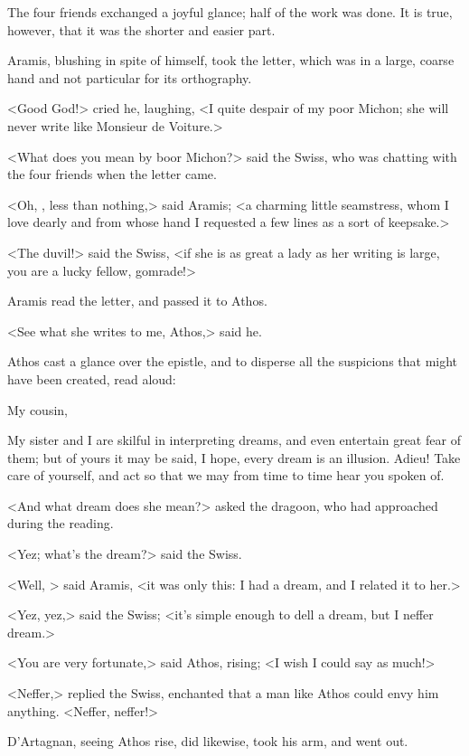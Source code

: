 The four friends exchanged a joyful glance; half of the work was done. It is true, however, that it was the shorter and easier part. 

Aramis, blushing in spite of himself, took the letter, which was in a large, coarse hand and not particular for its orthography. 

<Good God!> cried he, laughing, <I quite despair of my poor Michon; she will never write like Monsieur de Voiture.> 

<What does you mean by boor Michon?> said the Swiss, who was chatting with the four friends when the letter came. 

<Oh, , less than nothing,> said Aramis; <a charming little seamstress, whom I love dearly and from whose hand I requested a few lines as a sort of keepsake.> 

<The duvil!> said the Swiss, <if she is as great a lady as her writing is large, you are a lucky fellow, gomrade!> 

Aramis read the letter, and passed it to Athos. 

<See what she writes to me, Athos,> said he. 

Athos cast a glance over the epistle, and to disperse all the suspicions that might have been created, read aloud: 
\begin{mail}{}{My cousin,} 
	
	My sister and I are skilful in interpreting dreams, and even entertain great fear of them; but of yours it may be said, I hope, every dream is an illusion. Adieu! Take care of yourself, and act so that we may from time to time hear you spoken of. 
	
	\end{mail}

<And what dream does she mean?> asked the dragoon, who had approached during the reading. 

<Yez; what's the dream?> said the Swiss. 

<Well, > said Aramis, <it was only this: I had a dream, and I related it to her.> 

<Yez, yez,> said the Swiss; <it's simple enough to dell a dream, but I neffer dream.> 

<You are very fortunate,> said Athos, rising; <I wish I could say as much!> 

<Neffer,> replied the Swiss, enchanted that a man like Athos could envy him anything. <Neffer, neffer!> 

D'Artagnan, seeing Athos rise, did likewise, took his arm, and went out. 

